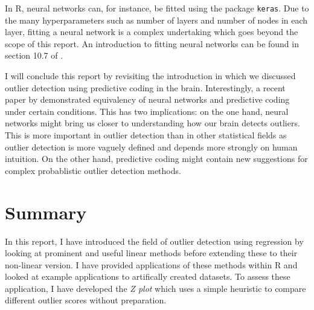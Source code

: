 \documentclass[]{report}
\theoremstyle{definition}
\theoremstyle{definition}
\theoremstyle{definition}
\theoremstyle{remark}
\begin{document}
In R, neural networks can, for instance, be fitted using the package
\texttt{keras}. \citep{keras} Due to the many hyperparameters such as
number of layers and number of nodes in each layer, fitting a neural
network is a complex undertaking which goes beyond the scope of this
report. An introduction to fitting neural networks can be found in
section 10.7 of \citet{Aggarwal2015}.

I will conclude this report by revisiting the introduction in which we
discussed outlier detection using predictive coding in the brain.
Interestingly, a recent paper by \citet{Whittington2017} demonstrated
equivalency of neural networks and predictive coding under certain
conditions. This has two implications: on the one hand, neural networks
might bring us closer to understanding how our brain detects outliers.
This is more important in outlier detection than in other statistical
fields as outlier detection is more vaguely defined and depends more
strongly on human intuition. On the other hand, predictive coding might
contain new suggestions for complex probablistic outlier detection
methods.

\hypertarget{summary}{%
\chapter{Summary}\label{summary}}

In this report, I have introduced the field of outlier detection using
regression by looking at prominent and useful linear methods before
extending these to their non-linear version. I have provided
applications of these methods within R and looked at example
applications to artifically created datasets. To assess these
application, I have developed the \emph{Z plot} which uses a simple
heuristic to compare different outlier scores without preparation.


\end{document}
